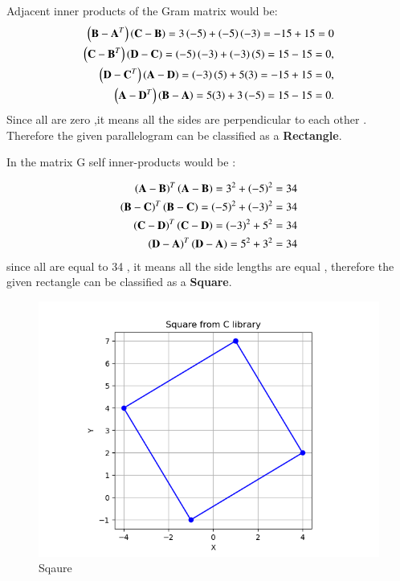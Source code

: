 \documentclass[journal]{IEEEtran}
\theoremstyle{remark}
\begin{document}
Adjacent inner products of the Gram matrix would be:
\begin{align}
\left(\mathbf{B-A}^T\right)\left(\mathbf{C-B}\right) = 3\left(-5\right) + \left(-5\right)\left(-3\right) = -15 + 15 = 0\\
\left(\mathbf{C-B}^T\right) \left(\mathbf{D-C}\right) = \left(-5\right)\left(-3\right) + \left(-3\right)(5) = 15 - 15 = 0,\\
\left(\mathbf{D-C}^T\right) \left(\mathbf{A-D}\right) = \left(-3\right)(5) + 5(3) = -15 + 15 = 0,\\
\left(\mathbf{A-D}^T\right) \left(\mathbf{B-A}\right) = 5(3) + 3\left(-5\right) = 15 - 15 = 0.
\end{align}
Since all are zero ,it means all the sides are perpendicular to each other . Therefore the given parallelogram can be classified as a \textbf{Rectangle}.

In the matrix G self inner-products would be 
:

\begin{align}
    {\ensuremath{\left(\mathbf{A-B}\right)}^T\ensuremath{\left(\mathbf{A-B}\right)}}={3^2+\left(-5\right)^2}={34}\\
    {\left(\mathbf{B-C}\right)^T\left(\mathbf{B-C}\right)}={\left(-5\right)^2+\left(-3\right)^2}={34}\\
    {\left(\mathbf{C-D}\right)^T\left(\mathbf{C-D}\right)}=\left(-3\right)^2+5^2={34}\\
    \left(\mathbf{D-A}\right)^T\left(\mathbf{D-A}\right)=5^2+3^2=34
\end{align}
since all are equal to 34 , it means all the side lengths are equal , therefore the given rectangle can be classified as a \textbf{Square}. 



\begin{figure}[H]
    \centering
    \includegraphics[width=1\columnwidth]{figs/square.png}
    \caption{Sqaure}
    \label{fig:placeholder_1}
\end{figure}
\end{document}
